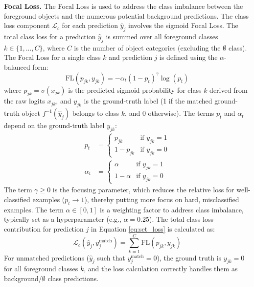 \textbf{Focal Loss.} The Focal Loss \cite{linFocalLossDense2018} is used to address the class imbalance between the foreground objects and the numerous potential background predictions. The class loss component $\mathcal{L}_c$ for each prediction $\hat{y}_j$ involves the sigmoid Focal Loss. The total class loss for a prediction $\hat{y}_j$ is summed over all foreground classes $k \in \{1, ..., C\}$, where $C$ is the number of object categories (excluding the $\emptyset$ class). The Focal Loss for a single class $k$ and prediction $j$ is defined using the $\alpha$-balanced form:
\begin{equation} \label{eq:focal_loss_corrected}
    \text{FL}(p_{jk}, y_{jk}) = - \alpha_t (1 - p_t)^\gamma \log(p_t)
\end{equation}
where $p_{jk} = \sigma(x_{jk})$ is the predicted sigmoid probability for class $k$ derived from the raw logits $x_{jk}$, and $y_{jk}$ is the ground-truth label (1 if the matched ground-truth object $f^{-1}(\hat{y}_j)$ belongs to class $k$, and 0 otherwise). The terms $p_t$ and $\alpha_t$ depend on the ground-truth label $y_{jk}$:
\begin{align*}
    p_t &= 
    \begin{cases} 
        p_{jk} & \text{if } y_{jk} = 1 \\
        1 - p_{jk} & \text{if } y_{jk} = 0 
    \end{cases} \\
    \alpha_t &= 
    \begin{cases} 
        \alpha & \text{if } y_{jk} = 1 \\
        1 - \alpha & \text{if } y_{jk} = 0 
    \end{cases}
\end{align*}
The term $\gamma \ge 0$ is the focusing parameter, which reduces the relative loss for well-classified examples ($p_t \to 1$), thereby putting more focus on hard, misclassified examples. The term $\alpha \in [0, 1]$ is a weighting factor to address class imbalance, typically set as a hyperparameter (e.g., $\alpha=0.25$). The total class loss contribution for prediction $j$ in Equation \ref{eq:set_loss} is calculated as:
\begin{equation*}
    \mathcal{L}_c(\hat{y}_j, y_j^{\text{match}}) = \sum_{k=1}^{C} \text{FL}(p_{jk}, y_{jk}) 
\end{equation*}
For unmatched predictions ($\hat{y}_j$ such that $y_j^{\text{match}} = 0$), the ground truth is $y_{jk}=0$ for all foreground classes $k$, and the loss calculation correctly handles them as background/$\emptyset$ class predictions.

